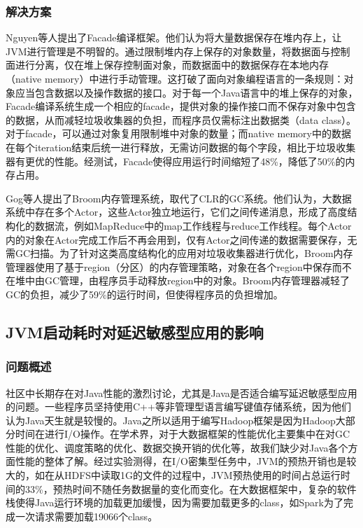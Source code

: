 \documentclass[lang=cn,12pt,a4paper,cite=authoryear]{elegantpaper}
\begin{document}
\subsubsection{解决方案}
Nguyen等人提出了Facade\cite{DBLP:conf/asplos/NguyenWBFHX15}编译框架。他们认为将大量数据保存在堆内存上，让JVM进行管理是不明智的。通过限制堆内存上保存的对象数量，将数据面与控制面进行分离，仅在堆上保存控制面对象，而数据面中的数据保存在本地内存（native memory）中进行手动管理。这打破了面向对象编程语言的一条规则：对象应当包含数据以及操作数据的接口。对于每一个Java语言中的堆上保存的对象，Facade编译系统生成一个相应的facade，提供对象的操作接口而不保存对象中包含的数据，从而减轻垃圾收集器的负担，而程序员仅需标注出数据类（data class）。对于facade，可以通过对象复用限制堆中对象的数量；而native memory中的数据在每个iteration结束后统一进行释放，无需访问数据的每个字段，相比于垃圾收集器有更优的性能。经测试，Facade使得应用运行时间缩短了48\%，降低了50\%的内存占用。

Gog等人提出了Broom\cite{DBLP:conf/hotos/GogGSVVRCMHI15}内存管理系统，取代了CLR的GC系统。他们认为，大数据系统中存在多个Actor，这些Actor独立地运行，它们之间传递消息，形成了高度结构化的数据流，例如MapReduce\cite{DBLP:journals/cacm/DeanG08}中的map工作线程与reduce工作线程。每个Actor内的对象在Actor完成工作后不再会用到，仅有Actor之间传递的数据需要保存，无需GC扫描。为了针对这类高度结构化的应用对垃圾收集器进行优化，Broom内存管理器使用了基于region（分区）的内存管理策略，对象在各个region中保存而不在堆中由GC管理，由程序员手动释放region中的对象。Broom内存管理器减轻了GC的负担，减少了59\%的运行时间，但使得程序员的负担增加。

\subsection{JVM启动耗时对延迟敏感型应用的影响}
\subsubsection{问题概述}
社区中长期存在对Java性能的激烈讨论，尤其是Java是否适合编写延迟敏感型应用的问题。一些程序员坚持使用C++等非管理型语言编写键值存储系统，因为他们认为Java天生就是较慢的。Java之所以适用于编写Hadoop框架是因为Hadoop大部分时间在进行I/O操作。在学术界，对于大数据框架的性能优化主要集中在对GC性能的优化、调度策略的优化、数据交换开销的优化等，故我们缺少对Java各个方面性能的整体了解。经过实验测得，在I/O密集型任务中，JVM的预热开销也是较大的，如在从HDFS中读取1G的文件的过程中，JVM预热使用的时间占总运行时间的33\%，预热时间不随任务数据量的变化而变化。在大数据框架中，复杂的软件栈使得Java运行环境的加载更加缓慢，因为需要加载更多的class，如Spark为了完成一次请求需要加载19066个class。
\end{document}

